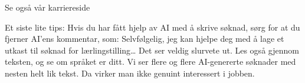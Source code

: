 Se også vår karriereside

Et siste lite tips:
Hvis du har fått hjelp av AI med å skrive søknad, sørg for at du fjerner AI’ens kommentar, som: Selvfølgelig, jeg kan hjelpe deg med å lage et utkast til søknad for lærlingstilling… Det ser veldig slurvete ut. Les også gjennom teksten, og se om språket er ditt. Vi ser flere og flere AI-genererte søknader med nesten helt lik tekst. Da virker man ikke genuint interessert i jobben.


\vskip 10pt


\vfil

\eject

